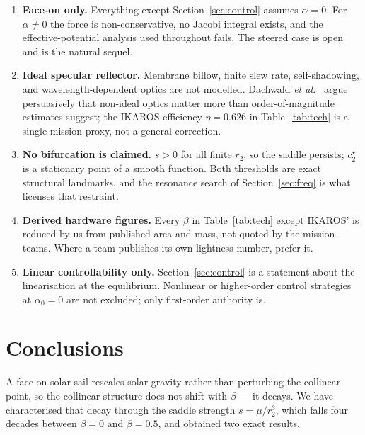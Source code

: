\documentclass[11pt,a4paper]{article}
\begin{document}
\begin{enumerate}
\item \textbf{Face-on only.} Everything except Section~\ref{sec:control} assumes
$\alpha=0$. For $\alpha\neq0$ the force is non-conservative, no Jacobi integral
exists, and the effective-potential analysis used throughout fails. The steered
case is open and is the natural sequel.

\item \textbf{Ideal specular reflector.} Membrane billow, finite slew rate,
self-shadowing, and wavelength-dependent optics are not modelled. Dachwald
\emph{et al.}~\cite{dachwald2013} argue persuasively that non-ideal optics matter
more than order-of-magnitude estimates suggest; the IKAROS efficiency
$\eta=0.626$ in Table~\ref{tab:tech} is a single-mission proxy, not a general
correction.

\item \textbf{No bifurcation is claimed.} $s>0$ for all finite $r_2$, so the
saddle persists; $c_2^\star$ is a stationary point of a smooth function. Both
thresholds are exact structural landmarks, and the resonance search of
Section~\ref{sec:freq} is what licenses that restraint.

\item \textbf{Derived hardware figures.} Every $\beta$ in Table~\ref{tab:tech}
except IKAROS' is reduced by us from published area and mass, not quoted by the
mission teams. Where a team publishes its own lightness number, prefer it.

\item \textbf{Linear controllability only.} Section~\ref{sec:control} is a
statement about the linearisation at the equilibrium. Nonlinear or
higher-order control strategies at $\alpha_0=0$ are not excluded; only
first-order authority is.
\end{enumerate}

\section{Conclusions}

A face-on solar sail rescales solar gravity rather than perturbing the collinear
point, so the collinear structure does not shift with $\beta$ --- it decays. We
have characterised that decay through the saddle strength $s=\mu/r_2^3$, which
falls four decades between $\beta=0$ and $\beta=0.5$, and obtained two exact
results.
\end{document}

